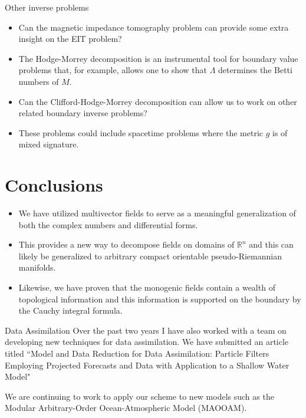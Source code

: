 \documentclass[aspectratio=169,handout]{beamer}
\newcommand{\R}{\mathbb{R}}
\begin{document}
\begin{frame}{Other inverse problems}
\vfill
\begin{itemize}
    \item Can the magnetic impedance tomography problem can provide some extra insight on the EIT problem?
    \item The Hodge-Morrey decomposition is an instrumental tool for boundary value problems that, for example, allows one to show that $\Lambda$ determines the Betti numbers of $M$.
    \item Can the Clifford-Hodge-Morrey decomposition can allow us to work on other related boundary inverse problems? 
    \item These problems could include spacetime problems where the metric $g$ is of mixed signature.
\end{itemize}
\vfill
\end{frame}

\section{Conclusions}

\begin{frame}{}
\vfill
\begin{itemize}
    \item We have utilized multivector fields to serve as a meaningful generalization of both the complex numbers and differential forms. 
    \item This provides a new way to decompose fields on domains of $\R^n$ and this can likely be generalized to arbitrary compact orientable pseudo-Riemannian manifolds.
    \item Likewise, we have proven that the monogenic fields contain a wealth of topological information and this information is supported on the boundary by the Cauchy integral formula.
\end{itemize}
\vfill
\end{frame}

\begin{frame}{Data Assimilation}
\vfill
Over the past two years I have also worked with a team on developing new techniques for data assimilation. We have submitted an article titled
``Model and Data Reduction for Data Assimilation: Particle Filters Employing Projected Forecasts and Data with Application to a Shallow Water Model"

We are continuing to work to apply our scheme to new models such as the Modular Arbitrary-Order Ocean-Atmospheric Model (MAOOAM).
\vfill
\end{frame}
\end{document}
